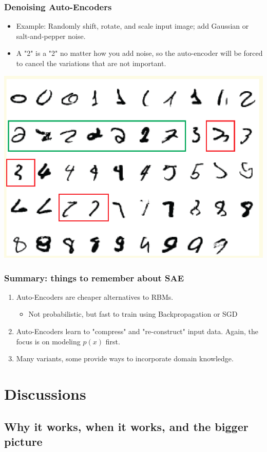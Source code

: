 \documentclass{beamer}
\newcommand{\bi}{\begin{itemize}}
\newcommand{\ei}{\end{itemize}}
\newcommand{\be}{\begin{enumerate}}
\newcommand{\ee}{\end{enumerate}}
\begin{document}
\begin{frame}
\frametitle{Denoising Auto-Encoders}
\bi
\item Example: Randomly shift, rotate, and scale input image; add Gaussian or salt-and-pepper noise.
\item A "2" is a "2" no matter how you add noise, so the auto-encoder will be forced to cancel the variations that are not important. 
\ei
\centerline{\includegraphics[scale=0.19]{figs/digit2}}
\end{frame}

\begin{frame}
\frametitle{Summary: things to remember about SAE}
\be
\item Auto-Encoders are cheaper alternatives to RBMs.
	\bi
	\item Not probabilistic, but fast to train using Backpropagation or SGD
	\ei
\pause
\item Auto-Encoders learn to "compress" and "re-construct" input data. Again, the focus is on modeling $p(x)$ first.  \pause
\item Many variants, some provide ways to incorporate domain knowledge.
\ee
\end{frame}



\section{Discussions}

\subsection[Why]{Why it works, when it works, and the bigger picture}
\end{document}
